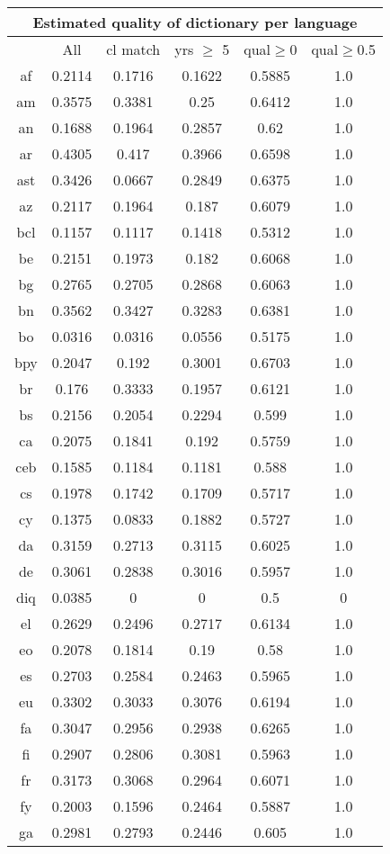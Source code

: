 \begin{figure}[h]
\centering
\begin{tabular}{cccccc}
\multicolumn{6}{c}{Estimated quality of dictionary per language}\\
\hline\hline
&All&cl match&yrs $\geq$ 5&qual$\geq$0&qual$\geq$0.5\\
\hline\hline
af&0.2114&0.1716&0.1622&0.5885&1.0\\
am&0.3575&0.3381&0.25&0.6412&1.0\\
an&0.1688&0.1964&0.2857&0.62&1.0\\
ar&0.4305&0.417&0.3966&0.6598&1.0\\
ast&0.3426&0.0667&0.2849&0.6375&1.0\\
az&0.2117&0.1964&0.187&0.6079&1.0\\
bcl&0.1157&0.1117&0.1418&0.5312&1.0\\
be&0.2151&0.1973&0.182&0.6068&1.0\\
bg&0.2765&0.2705&0.2868&0.6063&1.0\\
bn&0.3562&0.3427&0.3283&0.6381&1.0\\
bo&0.0316&0.0316&0.0556&0.5175&1.0\\
bpy&0.2047&0.192&0.3001&0.6703&1.0\\
br&0.176&0.3333&0.1957&0.6121&1.0\\
bs&0.2156&0.2054&0.2294&0.599&1.0\\
ca&0.2075&0.1841&0.192&0.5759&1.0\\
ceb&0.1585&0.1184&0.1181&0.588&1.0\\
cs&0.1978&0.1742&0.1709&0.5717&1.0\\
cy&0.1375&0.0833&0.1882&0.5727&1.0\\
da&0.3159&0.2713&0.3115&0.6025&1.0\\
de&0.3061&0.2838&0.3016&0.5957&1.0\\
diq&0.0385&0&0&0.5&0\\
el&0.2629&0.2496&0.2717&0.6134&1.0\\
eo&0.2078&0.1814&0.19&0.58&1.0\\
es&0.2703&0.2584&0.2463&0.5965&1.0\\
eu&0.3302&0.3033&0.3076&0.6194&1.0\\
fa&0.3047&0.2956&0.2938&0.6265&1.0\\
fi&0.2907&0.2806&0.3081&0.5963&1.0\\
fr&0.3173&0.3068&0.2964&0.6071&1.0\\
fy&0.2003&0.1596&0.2464&0.5887&1.0\\
ga&0.2981&0.2793&0.2446&0.605&1.0\\

\end{tabular}
\end{figure}
